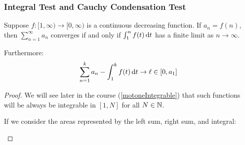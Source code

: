 \documentclass[../main.tex]{subfiles}
\begin{document}
\subsubsection{Integral Test and Cauchy Condensation Test}
\begin{proposition}
  Suppose $f: [1, \infty) \to [0, \infty)$ is a continuous decreasing function.
  If $a_n = f(n)$, then $\sum_{n = 1}^{\infty} a_n$ converges if and only if $\int_{1}^{n} f(t) \d{t}$ has a finite limit as $n \to \infty$.

  Furthermore:
  \[
    \sum_{n = 1}^{k} a_n - \int_{1}^{k} f(t) \d{t} \to \ell \in [0, a_1]
  \]
  \label{integralTest}
\end{proposition}
\begin{proof}
  We will see later in the course (\cref{motoneIntegrable}) that such functions will be always be integrable in $[1, N]$ for all $N \in \mathbb{N}$.

  If we consider the areas represented by the left sum, right sum, and integral:
  \begin{center}
\end{center}
\end{proof}
\end{document}
